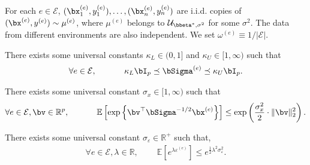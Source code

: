 \documentclass[10pt]{article}
\numberwithin{equation}{section}
\begin{document}
{\begin{condition}
\label{cond0-model-main}
    For each $e\in \mathcal{E}$,  $(\bx_1^{(e)}, y_1^{(e)}), \ldots, (\bx_{n}^{(e)}, y_{n}^{(e)})$ are i.i.d. copies of $(\bx^{(e)}, y^{(e)}) \sim \mu^{(e)}$, where $\mu^{(e)}$ belongs to $\mathcal{U}_{\bbeta^*, \sigma^2}$ for some $\sigma^2$. The data from different environments are also independent.  We set $\omega^{(e)} \equiv 1/|\mathcal{E}|$. 
\end{condition}

\begin{condition}
\label{cond1-well-condition-main}
    There exists some universal constants $\kappa_L \in (0,1]$ and $\kappa_U \in [1,\infty)$ such that
    \begin{align}
        \forall e\in \mathcal{E}, ~~~~~~~~~~ \kappa_L \bI_p \preceq \bSigma^{(e)} \preceq \kappa_U \bI_p.
    \end{align}
\end{condition}

\begin{condition}
\label{cond2-subgaussain-x-main}
    There exists some universal constant $\sigma_x \in [1,\infty)$ such that
    \begin{align}
        \forall e\in \mathcal{E}, \bv \in \mathbb{R}^p, ~~~~~~~~~~  \mathbb{E} \left[\exp\left\{\bv^\top {\bSigma}^{-1/2}\bx^{(e)}\right\}\right]  \le \exp\left(\frac{\sigma_x^2}{2} \cdot \|\bv\|_2^2\right).
    \end{align}
\end{condition}

\begin{condition}
\label{cond3-sub-gaussian-eps-main}
    There exists some universal constant $\sigma_\varepsilon \in \mathbb{R}^+$ such that,
    \begin{align}
        \forall e\in \mathcal{E}, \lambda \in \mathbb{R}, ~~~~~~~~~~ \mathbb{E} [e^{\lambda \varepsilon^{(e)}}] \le e^{\frac{1}{2} \lambda^2 \sigma_\varepsilon^2}.
    \end{align}
\end{condition}

}
\end{document}

